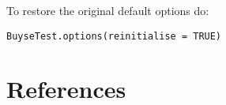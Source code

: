 \documentclass[12pt]{article}
\begin{document}
To restore the original default options do:
\lstset{language=r,label= ,caption= ,captionpos=b,numbers=none}
\begin{lstlisting}
BuyseTest.options(reinitialise = TRUE)
\end{lstlisting}

\clearpage


\section*{References}
\label{sec:org9c311f7}
\begingroup
\renewcommand{\section}[2]{}




\endgroup
\end{document}
